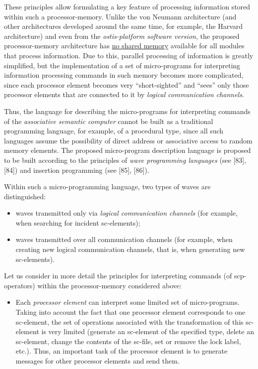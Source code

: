 \documentclass{article}
\begin{document}
\begin{multicols}{2}
	These principles allow formulating a key feature of	processing information stored within such a processor-memory. Unlike the von Neumann architecture (and other architectures developed around the same time, for example, the Harvard architecture) and even from the \textit{ostis-platform software version}, the proposed processor-memory architecture has \uline{no shared memory} available for all modules that process information. Due to this, parallel processing of information is greatly simplified, but the implementation of a set of micro-programs for interpreting information processing commands in such memory becomes more complicated, since each processor element becomes very “short-sighted” and “sees” only those processor elements that are connected to it by \textit{logical communication channels}.

	Thus, the language for describing the micro-programs for interpreting commands of the \textit{associative semantic computer} cannot be built as a traditional programming language, for example, of a procedural type, since all such languages assume the possibility of direct address or associative access to random memory elements. The proposed micro-program description language is proposed to be built according to the principles of \textit{wave programming languages} (see [83], [84]) and insertion programming (see [85], [86]).

	Within such a micro-programming language, two types of waves are distinguished:
	
	\begin{itemize}
		\item waves transmitted only via \textit{logical communication channels} (for example, when searching for incident sc-elements);
		
		\item waves transmitted over all communication channels (for example, when creating new logical communication channels, that is, when generating new sc-elements).
	\end{itemize}

	Let us consider in more detail the principles for interpreting commands (of scp-operators) within the processor-memory considered above:
	
	\begin{itemize}
		\item Each \textit{processor element} can interpret some limited set of micro-programs. Taking into account the fact that one processor element corresponds to one sc-element, the set of operations associated with the transformation of this sc-element is very limited (generate an sc-element of the specified type, delete an sc-element, change the contents of the sc-file, set or remove the lock label, etc.). Thus, an important task of the processor element is to generate messages for other processor elements and send them.
		

\end{itemize}
\end{multicols}
\end{document}
